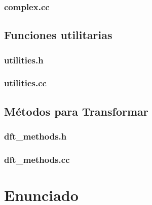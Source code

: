 \documentclass{article}
\begin{document}
    \subsubsection{complex.cc}
      
  \subsection{Funciones utilitarias}
    \subsubsection{utilities.h}
      
    \subsubsection{utilities.cc}
      
  \subsection{Métodos para Transformar}
    \subsubsection{dft\_methods.h}
      
    \subsubsection{dft\_methods.cc}
      




%    

\section{Enunciado}
\end{document}

